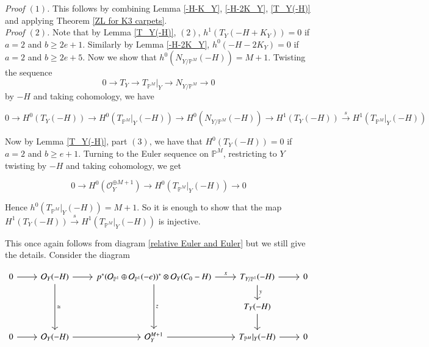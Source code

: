 \documentclass[11pt,twoside]{amsart}
\theoremstyle{plain}
\numberwithin{equation}{section}
\theoremstyle{definition}
\begin{document}
\noindent\textit{Proof $(1)$.} This follows by combining Lemma \ref{-H-K_Y}, \ref{-H-2K_Y}, \ref{T_Y(-H)} and applying Theorem \ref{ZL for K3 carpets}. \\

\noindent\textit{Proof $(2)$.} Note that by Lemma \ref{T_Y(-H)}, $(2)$, $h^1(T_Y(-H+K_Y)) = 0$ if $a = 2$ and $b \geq 2e+1$. Similarly by Lemma \ref{-H-2K_Y}, $h^0(-H-2K_Y) = 0$ if $a = 2$ and $b \geq 2e+5$. Now we show that $h^0(N_{Y/\mathbb{P}^M}(-H)) = M+1$. Twisting the sequence $$0 \to T_Y \to T_{\mathbb{P}^M}|_Y \to N_{Y/\mathbb{P}^M} \to 0$$ by $-H$ and taking cohomology, we have 

\begin{equation}\label{35}
0 \to H^0(T_Y(-H)) \to H^0(T_{\mathbb{P}^M}|_Y(-H)) \to H^0(N_{Y/\mathbb{P}^M}(-H)) \to H^1(T_Y(-H)) \xrightarrow{s}  H^1(T_{\mathbb{P}^M}|_Y(-H))
\end{equation}

Now by Lemma \ref{T_Y(-H)}, part $(3)$, we have that $H^0(T_Y(-H)) = 0$ if $a = 2$ and $b \geq e+1$. Turning to the Euler sequence on $\mathbb{P}^M$, restricting to $Y$ twisting by $-H$ and taking cohomology, we get

\begin{equation}\label{36}
    0 \to H^0(\mathcal{O}_Y^{\oplus M+1}) \to H^0(T_{\mathbb{P}^M}|_Y(-H)) \to 0
\end{equation}

Hence $h^0(T_{\mathbb{P}^M}|_Y(-H)) = M+1$. So it is enough to show that the map $H^1(T_Y(-H)) \xrightarrow{s} H^1(T_{\mathbb{P}^M}|_Y(-H))$ is injective. \\

\color{blue}

This once again follows from diagram \ref{relative Euler and Euler} but we still give the details. 
Consider the diagram 

\begin{equation}
\begin{tikzcd}\label{relative Euler and Euler 2}
  0 \arrow[r] & \mathcal{O}_Y(-H) \arrow[r] \arrow[dd, "\cong"] & p^*(\mathcal{O}_{\mathbb{P}^1} \oplus \mathcal{O}_{\mathbb{P}^1}(-e))^* \otimes \mathcal{O}_Y(C_0-H) \arrow[r, "x"] \arrow[dd, "z"] & T_{Y/\mathbb{P}^1}(-H) \arrow[r] \arrow[d, "y"] & 0 \\
  &&& T_Y(-H) \arrow[d] \\
   0 \arrow[r] & \mathcal{O}_Y(-H) \arrow[r] & \mathcal{O}_Y^{M+1} \arrow[r] & T_{\mathbb{P}^M}|_Y(-H) \arrow[r] & 0
\end{tikzcd}
\end{equation}
\end{document}
